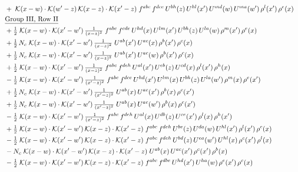 \documentclass[10pt]{article}
\numberwithin{equation}{section}
\begin{document}
\begin{align}
&\quad +\;\mathcal{K}(x-w)\cdot\mathcal{K}(w'-z)\,\mathcal{K}(x-z)\cdot\mathcal{K}(x'-z)\;f^{abc}\,f^{dce}\,U^{bh}(z)\,U^{hl}(x')\,U^{md}(w)\,U^{ma}(w')\,\rho^{l}(x')\,\rho^{e}(x)\notag\\
&\quad\underline{\text{Group III, Row II}}\notag\\
&\quad +\tfrac{1}{2}\;\mathcal{K}(x-w)\cdot\mathcal{K}(x'-w')\,\tfrac{1}{(x-z)^{2}}\;f^{abc}\,f^{cde}\,U^{hd}(x)\,U^{lm}(x')\,U^{bh}(z)\,U^{la}(w)\,\rho^{m}(x')\,\rho^{e}(x)\notag\\
&\quad +\tfrac{1}{2}\,N_c\;\mathcal{K}(x-w)\cdot\mathcal{K}(x'-w')\,\tfrac{1}{(x-z)^{2}}\;U^{ab}(x')\,U^{ac}(x)\,\rho^{b}(x')\,\rho^{c}(x)\notag\\
&\quad +\tfrac{1}{2}\,N_c\;\mathcal{K}(x-w)\cdot\mathcal{K}(x'-w')\,\tfrac{1}{(x-z)^{2}}\;U^{ab}(x')\,U^{ac}(w)\,\rho^{b}(x')\,\rho^{c}(x)\notag\\
&\quad +\tfrac{1}{2}\;\mathcal{K}(x-w)\cdot\mathcal{K}(x'-w')\,\tfrac{1}{(x-z)^{2}}\;f^{abc}\,f^{deh}\,U^{al}(x')\,U^{eb}(z)\,U^{cd}(x)\,\rho^{l}(x')\,\rho^{h}(x)\notag\\
&\quad -\tfrac{1}{2}\;\mathcal{K}(x-w)\cdot\mathcal{K}(x'-w')\,\tfrac{1}{(x'-z)^{2}}\;f^{abc}\,f^{dce}\,U^{hd}(x')\,U^{lm}(x)\,U^{bh}(z)\,U^{la}(w')\,\rho^{m}(x)\,\rho^{e}(x')\notag\\
&\quad +\tfrac{1}{2}\,N_c\;\mathcal{K}(x-w)\cdot\mathcal{K}(x'-w')\,\tfrac{1}{(x'-z)^{2}}\;U^{ab}(x)\,U^{ac}(x')\,\rho^{b}(x)\,\rho^{c}(x')\notag\\
&\quad +\tfrac{1}{2}\,N_c\;\mathcal{K}(x-w)\cdot\mathcal{K}(x'-w')\,\tfrac{1}{(x'-z)^{2}}\;U^{ab}(x)\,U^{ac}(w')\,\rho^{b}(x)\,\rho^{c}(x')\notag\\
&\quad -\tfrac{1}{2}\;\mathcal{K}(x-w)\cdot\mathcal{K}(x'-w')\,\tfrac{1}{(x'-z)^{2}}\;f^{abc}\,f^{deh}\,U^{al}(x)\,U^{db}(z)\,U^{ce}(x')\,\rho^{l}(x)\,\rho^{h}(x')\notag\\
&\quad +\tfrac{1}{2}\;\mathcal{K}(x-w)\cdot\mathcal{K}(x'-w')\,\mathcal{K}(x-z)\cdot\mathcal{K}(x'-z)\;f^{abc}\,f^{deh}\,U^{be}(z)\,U^{da}(w)\,U^{hl}(x')\,\rho^{l}(x')\,\rho^{c}(x)\notag\\
&\quad -\tfrac{1}{2}\;\mathcal{K}(x-w)\cdot\mathcal{K}(x'-w')\,\mathcal{K}(x-z)\cdot\mathcal{K}(x'-z)\;f^{abc}\,f^{deh}\,U^{bd}(z)\,U^{ea}(w')\,U^{hl}(x)\,\rho^{c}(x')\,\rho^{l}(x)\notag\\
&\quad -N_c\;\mathcal{K}(x-w)\cdot\mathcal{K}(x'-w')\,\mathcal{K}(x-z)\cdot\mathcal{K}(x'-z)\;U^{ab}(x)\,U^{ac}(x')\,\rho^{c}(x')\,\rho^{b}(x)\notag\\
&\quad -\tfrac{1}{2}\;\mathcal{K}(x-w)\cdot\mathcal{K}(x'-w')\,\mathcal{K}(x-z)\cdot\mathcal{K}(x'-z)\;f^{abc}\,f^{dbe}\,U^{hd}(x')\,U^{ha}(w)\,\rho^{e}(x')\,\rho^{c}(x)\notag\\

\end{align}
\end{document}
